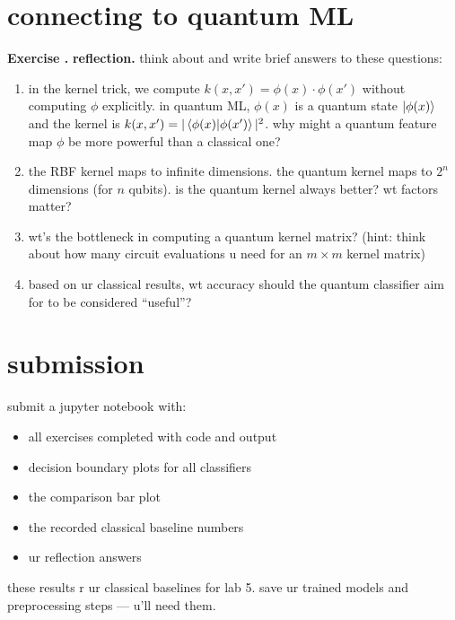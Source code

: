 \documentclass[11pt,a4paper]{article}
\theoremstyle{definition}
\theoremstyle{remark}
\newcounter{exercise}[section]
\newenvironment{exercise}{\refstepcounter{exercise}\par\medskip\noindent\textbf{Exercise \theexercise.}\rmfamily}{\medskip}
\begin{document}
\section{connecting to quantum ML}

\begin{exercise}
\textbf{reflection.}
think about and write brief answers to these questions:
\begin{enumerate}[leftmargin=*]
  \item in the kernel trick, we compute $k(x, x') = \phi(x) \cdot \phi(x')$ without computing $\phi$ explicitly. in quantum ML, $\phi(x)$ is a quantum state $\ket{\phi(x)}$ and the kernel is $k(x, x') = |\braket{\phi(x)|\phi(x')}|^2$. why might a quantum feature map $\phi$ be more powerful than a classical one?
  \item the RBF kernel maps to infinite dimensions. the quantum kernel maps to $2^n$ dimensions (for $n$ qubits). is the quantum kernel always better? wt factors matter?
  \item wt's the bottleneck in computing a quantum kernel matrix? (hint: think about how many circuit evaluations u need for an $m \times m$ kernel matrix)
  \item based on ur classical results, wt accuracy should the quantum classifier aim for to be considered ``useful''?
\end{enumerate}
\end{exercise}

\section{submission}

submit a jupyter notebook with:
\begin{itemize}[leftmargin=*]
  \item all exercises completed with code and output
  \item decision boundary plots for all classifiers
  \item the comparison bar plot
  \item the recorded classical baseline numbers
  \item ur reflection answers
\end{itemize}

these results r ur classical baselines for lab 5. save ur trained models and preprocessing steps --- u'll need them.
\end{document}
